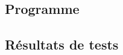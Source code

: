 \documentclass{report}
\begin{document}
  	  \subsection{Programme}
        
      \newpage
      \subsection{Résultats de tests}
\end{document}
